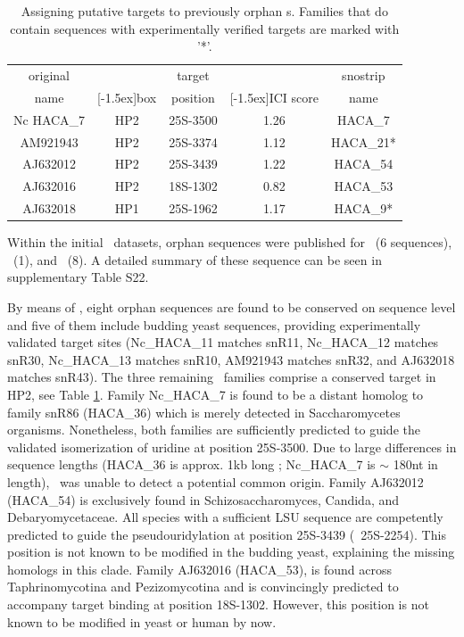 \begin{table}
  \caption[Potential targets for orphan {\haca}s.]{Assigning putative 
    targets to previously
    orphan \haca s. Families that do contain sequences with
    experimentally verified targets are marked with '*'. }
  \label{tab:orphan_hacas_short}
  \begin{center}
    \begin{footnotesize}
      \begin{tabular}{c|c|c|c|c}
        original&&target&&snostrip\\
        name&\raisebox{1.5ex}[-1.5ex]{box}&position&\raisebox{1.5ex}[-1.5ex]{ICI
            score}&name\\
        \hline
        Nc HACA\_7&HP2&25S-3500&1.26&HACA\_7\\
        AM921943&HP2&25S-3374&1.12&HACA\_21*\\
        AJ632012&HP2&25S-3439&1.22&HACA\_54\\
        AJ632016&HP2&18S-1302&0.82&HACA\_53\\
        AJ632018&HP1&25S-1962&1.17&HACA\_9*\\
      \end{tabular}
    \end{footnotesize}
  \end{center}
\end{table}

Within the initial \haca\ datasets, orphan sequences were published
for \ncr\ (6 sequences), \afu\ (1), and \spo\ (8).  A detailed summary
of these sequence can be seen in supplementary Table S22.

By means of \snostrip, eight orphan sequences are found to be
conserved on sequence level and five of them include budding yeast
sequences, providing experimentally validated target sites
(Nc\_HACA\_11 matches snR11, Nc\_HACA\_12 matches snR30, Nc\_HACA\_13
matches snR10, AM921943 matches snR32, and AJ632018 matches
snR43). The three remaining \sno\ families comprise a conserved target
in HP2, see Table \ref{tab:orphan_hacas_short}. Family Nc\_HACA\_7 is
found to be a distant homolog to family snR86 (HACA\_36) which is
merely detected in Saccharomycetes organisms. Nonetheless, both
families are sufficiently predicted to guide the validated
isomerization of uridine at position 25S-3500. Due to large
differences in sequence lengths (HACA\_36 is approx. 1kb long ;
Nc\_HACA\_7 is $\sim$ 180nt in length), \snostrip\ was unable to
detect a potential common origin. Family AJ632012 (HACA\_54) is
exclusively found in Schizosaccharomyces, Candida, and
Debaryomycetaceae. All species with a sufficient LSU sequence are
competently predicted to guide the pseudouridylation at position
25S-3439 (\sce\ 25S-2254). This position is not known to be modified
in the budding yeast, explaining the missing homologs in this
clade. Family AJ632016 (HACA\_53), is found across Taphrinomycotina
and Pezizomycotina and is convincingly predicted to accompany target
binding at position 18S-1302. However, this position is not known to
be modified in yeast or human by now.

